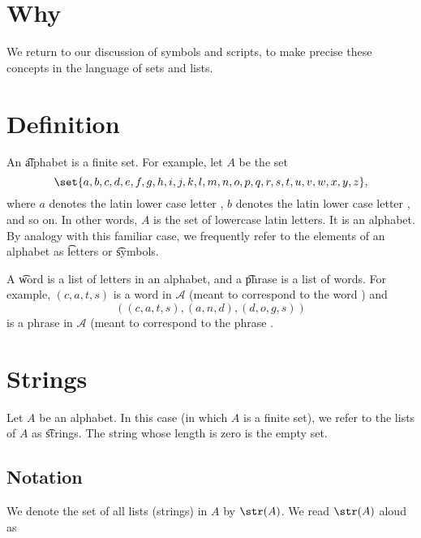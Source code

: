 
\section*{Why}

We return to our discussion of symbols and scripts, to make precise these concepts in the language of sets and lists.

\section*{Definition}

An \t{alphabet} is a finite set.
For example, let $A$ be the set
    \[
\set{a, b, c, d, e, f,g,h,i,j,k,l,m,n,o,p,q,r,s,t,u,v,w, x, y,z},
    \]
where $a$ denotes the latin lower case letter , $b$ denotes the latin lower case letter , and so on.
In other words, $A$ is the set of lowercase latin letters.
It is an alphabet.
By analogy with this familiar case, we frequently refer to the elements of an alphabet as \t{letters} or \t{symbols}.

A \t{word} is a list of letters in an alphabet, and a \t{phrase} is a list of words.
For example, $(c,a,t,s)$ is a word in $\mathcal{A} $ (meant to correspond to the word ) and
    \[
((c,a,t,s), (a,n,d), (d,o,g,s))
    \]
is a phrase in $\mathcal{A} $ (meant to correspond to the phrase .

\section*{Strings}

Let $A$ be an alphabet.
In this case (in which $A$ is a finite set), we refer to the lists of $A$ as \t{strings}.
The string whose length is zero is the empty set.

\subsection*{Notation}

We denote the set of all lists (strings) in $A$ by $\str(A)$.
We read $\str(A)$ aloud as 
